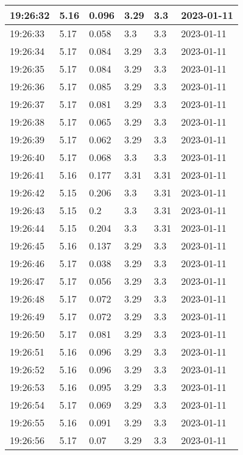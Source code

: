 \begin{longtable}{|l|l|l|l|l|l|}
        19:26:32 & 5.16 & 0.096 & 3.29 & 3.3 & 2023-01-11 \\ \hline
        19:26:33 & 5.17 & 0.058 & 3.3 & 3.3 & 2023-01-11 \\ \hline
        19:26:34 & 5.17 & 0.084 & 3.29 & 3.3 & 2023-01-11 \\ \hline
        19:26:35 & 5.17 & 0.084 & 3.29 & 3.3 & 2023-01-11 \\ \hline
        19:26:36 & 5.17 & 0.085 & 3.29 & 3.3 & 2023-01-11 \\ \hline
        19:26:37 & 5.17 & 0.081 & 3.29 & 3.3 & 2023-01-11 \\ \hline
        19:26:38 & 5.17 & 0.065 & 3.29 & 3.3 & 2023-01-11 \\ \hline
        19:26:39 & 5.17 & 0.062 & 3.29 & 3.3 & 2023-01-11 \\ \hline
        19:26:40 & 5.17 & 0.068 & 3.3 & 3.3 & 2023-01-11 \\ \hline
        19:26:41 & 5.16 & 0.177 & 3.31 & 3.31 & 2023-01-11 \\ \hline
        19:26:42 & 5.15 & 0.206 & 3.3 & 3.31 & 2023-01-11 \\ \hline
        19:26:43 & 5.15 & 0.2 & 3.3 & 3.31 & 2023-01-11 \\ \hline
        19:26:44 & 5.15 & 0.204 & 3.3 & 3.31 & 2023-01-11 \\ \hline
        19:26:45 & 5.16 & 0.137 & 3.29 & 3.3 & 2023-01-11 \\ \hline
        19:26:46 & 5.17 & 0.038 & 3.29 & 3.3 & 2023-01-11 \\ \hline
        19:26:47 & 5.17 & 0.056 & 3.29 & 3.3 & 2023-01-11 \\ \hline
        19:26:48 & 5.17 & 0.072 & 3.29 & 3.3 & 2023-01-11 \\ \hline
        19:26:49 & 5.17 & 0.072 & 3.29 & 3.3 & 2023-01-11 \\ \hline
        19:26:50 & 5.17 & 0.081 & 3.29 & 3.3 & 2023-01-11 \\ \hline
        19:26:51 & 5.16 & 0.096 & 3.29 & 3.3 & 2023-01-11 \\ \hline
        19:26:52 & 5.16 & 0.096 & 3.29 & 3.3 & 2023-01-11 \\ \hline
        19:26:53 & 5.16 & 0.095 & 3.29 & 3.3 & 2023-01-11 \\ \hline
        19:26:54 & 5.17 & 0.069 & 3.29 & 3.3 & 2023-01-11 \\ \hline
        19:26:55 & 5.16 & 0.091 & 3.29 & 3.3 & 2023-01-11 \\ \hline
        19:26:56 & 5.17 & 0.07 & 3.29 & 3.3 & 2023-01-11 \\ \hline

\end{longtable}
